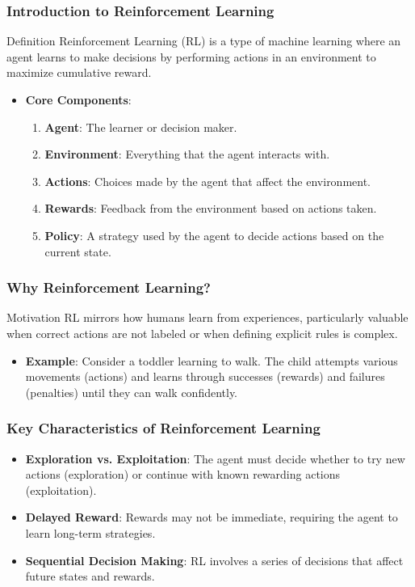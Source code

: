 \documentclass[aspectratio=169]{beamer}
\begin{document}
\begin{frame}[fragile]
    \frametitle{Introduction to Reinforcement Learning}
    \begin{block}{Definition}
        Reinforcement Learning (RL) is a type of machine learning where an agent learns to make decisions by performing actions in an environment to maximize cumulative reward.
    \end{block}
    
    \begin{itemize}
        \item \textbf{Core Components}:
        \begin{enumerate}
            \item \textbf{Agent}: The learner or decision maker.
            \item \textbf{Environment}: Everything that the agent interacts with.
            \item \textbf{Actions}: Choices made by the agent that affect the environment.
            \item \textbf{Rewards}: Feedback from the environment based on actions taken.
            \item \textbf{Policy}: A strategy used by the agent to decide actions based on the current state.
        \end{enumerate}
    \end{itemize}
\end{frame}

\begin{frame}[fragile]
    \frametitle{Why Reinforcement Learning?}
    \begin{block}{Motivation}
        RL mirrors how humans learn from experiences, particularly valuable when correct actions are not labeled or when defining explicit rules is complex.
    \end{block}
    
    \begin{itemize}
        \item \textbf{Example}: 
        Consider a toddler learning to walk. The child attempts various movements (actions) and learns through successes (rewards) and failures (penalties) until they can walk confidently.
    \end{itemize}
\end{frame}

\begin{frame}[fragile]
    \frametitle{Key Characteristics of Reinforcement Learning}
    \begin{itemize}
        \item \textbf{Exploration vs. Exploitation}: The agent must decide whether to try new actions (exploration) or continue with known rewarding actions (exploitation).
        \item \textbf{Delayed Reward}: Rewards may not be immediate, requiring the agent to learn long-term strategies.
        \item \textbf{Sequential Decision Making}: RL involves a series of decisions that affect future states and rewards.
    \end{itemize}
\end{frame}
\end{document}
